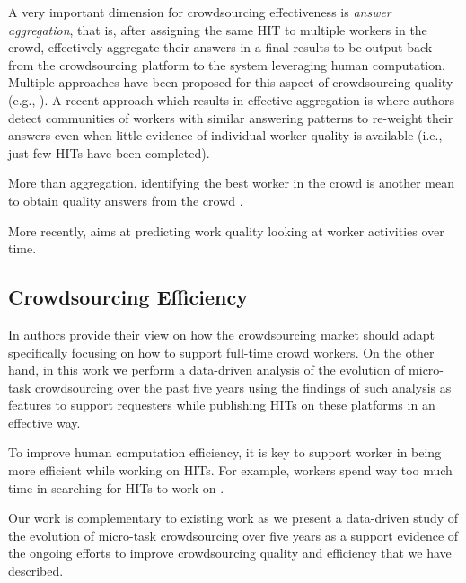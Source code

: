 A very important dimension for crowdsourcing effectiveness is \emph{answer aggregation}, that is, after assigning the same HIT to multiple workers in the crowd, effectively aggregate their answers in a final results to be output back from the crowdsourcing platform to the system leveraging human computation. Multiple approaches have been proposed for this aspect of crowdsourcing quality (e.g.,
\cite{Venanzi:2014:CBA:2566486.2567989,square,zencrowd,Hosseini:2012:ALM:2260641.2260661}).
% 
A recent approach which results in effective aggregation is \cite{Venanzi:2014:CBA:2566486.2567989} where authors detect communities of workers with similar answering patterns to re-weight their answers even when little evidence of individual worker quality is available (i.e., just few HITs have been completed).


More than aggregation, identifying the best worker in the crowd is another mean to obtain quality answers from the crowd \cite{pickacrowd,bozzon}.

More recently, \cite{Jung14-hcomp} aims at predicting work quality looking at worker activities over time.

\subsection{Crowdsourcing Efficiency}

In \cite{Kittur:2013:FCW:2441776.2441923} authors provide their view on how the crowdsourcing market should adapt specifically focusing on how to  support full-time crowd workers. On the other hand, in this work we perform a data-driven analysis of the evolution of micro-task crowdsourcing over the past five years using the findings of such analysis as features to support requesters while publishing HITs on these platforms in an effective way.

\cite{finishthem,scaleup}

To improve human computation efficiency, it is key to support worker in being more efficient while working on HITs. For example, workers spend way too much time in searching for HITs to work on \cite{Kucherbaev:2014:TET:2598153.2602249}.






Our work is complementary to existing work as we present a data-driven study of the evolution of micro-task crowdsourcing over five years as a support evidence of the ongoing efforts to improve crowdsourcing quality and efficiency that we have described.